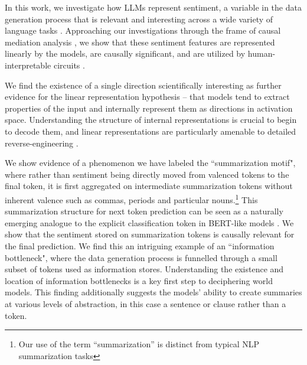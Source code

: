 \documentclass{article} %
\begin{document}
In this work, we investigate how LLMs represent sentiment, a variable in the data generation process that is relevant and interesting across a wide variety of language tasks \citep{cui2023survey}. Approaching our investigations through the frame of causal mediation analysis \citep{vig2020causal,pearl2022direct, Geiger-etal:2023:CA}, we show that these sentiment features are represented linearly by the models, are causally significant, and are utilized by human-interpretable circuits
\citep{olah2020zoom,elhage2021mathematical}.

We find the existence of a single direction scientifically interesting as further evidence for the linear representation hypothesis \citep{mikolov-etal-2013-linguistic,elhage2022superposition}-- that models tend to extract properties of the input and internally represent them as directions in activation space. Understanding the structure of internal representations is crucial to begin to decode them, and linear representations are particularly amenable to detailed reverse-engineering \citep{nanda2023emergent}.


We show evidence of a phenomenon we have labeled the ``summarization motif", where rather than sentiment being directly moved from valenced tokens to the final token, it is first aggregated on intermediate summarization tokens without inherent valence such as commas, periods and particular nouns.\footnote{Our use of the term ``summarization'' is distinct from typical NLP summarization tasks} This summarization structure for next token prediction can be seen as a naturally emerging analogue to the explicit classification token in BERT-like models \citep{devlin2018bert}. We show that the sentiment stored on summarization tokens is causally relevant for the final prediction. We find this an intriguing example of an ``information bottleneck", where the data generation process is funnelled through a small subset of tokens used as information stores. Understanding the existence and location of information bottlenecks is a key first step to deciphering world models. This finding additionally suggests the models' ability to create summaries at various levels of abstraction, in this case a sentence or clause rather than a token. 
\end{document}
